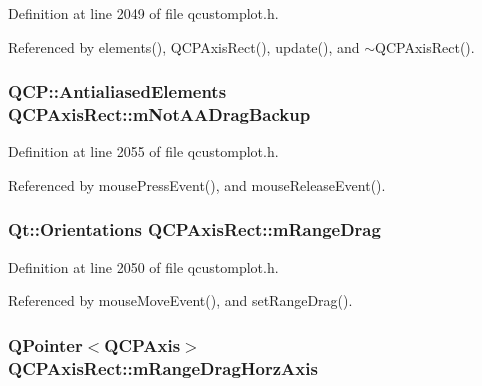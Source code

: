 Definition at line 2049 of file qcustomplot.\+h.



Referenced by elements(), Q\+C\+P\+Axis\+Rect(), update(), and $\sim$\+Q\+C\+P\+Axis\+Rect().

\hypertarget{class_q_c_p_axis_rect_a6fcb12e052e276d57efbb128be31d6f5}{}
\subsubsection[{m\+Not\+A\+A\+Drag\+Backup}]{\setlength{\rightskip}{0pt plus 5cm}Q\+C\+P\+::\+Antialiased\+Elements Q\+C\+P\+Axis\+Rect\+::m\+Not\+A\+A\+Drag\+Backup\hspace{0.3cm}{\ttfamily [protected]}}\label{class_q_c_p_axis_rect_a6fcb12e052e276d57efbb128be31d6f5}


Definition at line 2055 of file qcustomplot.\+h.



Referenced by mouse\+Press\+Event(), and mouse\+Release\+Event().

\hypertarget{class_q_c_p_axis_rect_aa9f107f66ca3469ad50ee6cea7c9e237}{}
\subsubsection[{m\+Range\+Drag}]{\setlength{\rightskip}{0pt plus 5cm}Qt\+::\+Orientations Q\+C\+P\+Axis\+Rect\+::m\+Range\+Drag\hspace{0.3cm}{\ttfamily [protected]}}\label{class_q_c_p_axis_rect_aa9f107f66ca3469ad50ee6cea7c9e237}


Definition at line 2050 of file qcustomplot.\+h.



Referenced by mouse\+Move\+Event(), and set\+Range\+Drag().

\hypertarget{class_q_c_p_axis_rect_aeaaa38c6d2030dd5f84461e2596e41e3}{}
\subsubsection[{m\+Range\+Drag\+Horz\+Axis}]{\setlength{\rightskip}{0pt plus 5cm}Q\+Pointer$<${\bf Q\+C\+P\+Axis}$>$ Q\+C\+P\+Axis\+Rect\+::m\+Range\+Drag\+Horz\+Axis\hspace{0.3cm}{\ttfamily [protected]}}\label{class_q_c_p_axis_rect_aeaaa38c6d2030dd5f84461e2596e41e3}


